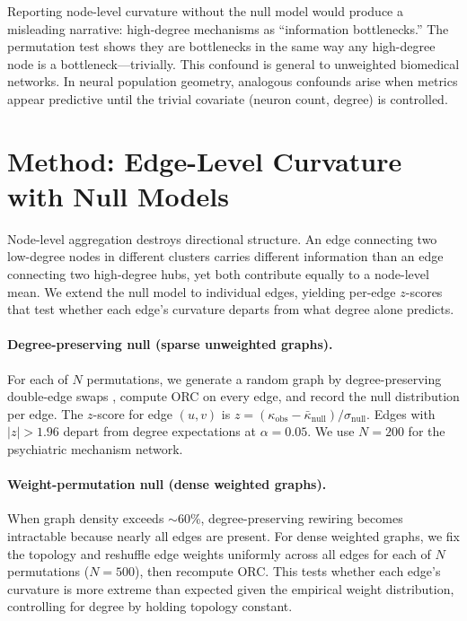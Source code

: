 \documentclass[11pt]{article}
\begin{document}
Reporting node-level curvature without the null model would produce a misleading narrative: high-degree mechanisms as ``information bottlenecks.'' The permutation test shows they are bottlenecks in the same way any high-degree node is a bottleneck---trivially. This confound is general to unweighted biomedical networks. In neural population geometry, analogous confounds arise when metrics appear predictive until the trivial covariate (neuron count, degree) is controlled.

\section{Method: Edge-Level Curvature with Null Models}
\label{sec:method}

Node-level aggregation destroys directional structure. An edge connecting two low-degree nodes in different clusters carries different information than an edge connecting two high-degree hubs, yet both contribute equally to a node-level mean. We extend the null model to individual edges, yielding per-edge $z$-scores that test whether each edge's curvature departs from what degree alone predicts.

\paragraph{Degree-preserving null (sparse unweighted graphs).} For each of $N$ permutations, we generate a random graph by degree-preserving double-edge swaps \citep{maslov2002specificity}, compute ORC on every edge, and record the null distribution per edge. The $z$-score for edge $(u,v)$ is $z = (\kappa_{\text{obs}} - \bar{\kappa}_{\text{null}}) / \sigma_{\text{null}}$. Edges with $|z| > 1.96$ depart from degree expectations at $\alpha = 0.05$. We use $N = 200$ for the psychiatric mechanism network.

\paragraph{Weight-permutation null (dense weighted graphs).} When graph density exceeds $\sim$60\%, degree-preserving rewiring becomes intractable because nearly all edges are present. For dense weighted graphs, we fix the topology and reshuffle edge weights uniformly across all edges for each of $N$ permutations ($N = 500$), then recompute ORC. This tests whether each edge's curvature is more extreme than expected given the empirical weight distribution, controlling for degree by holding topology constant.
\end{document}

